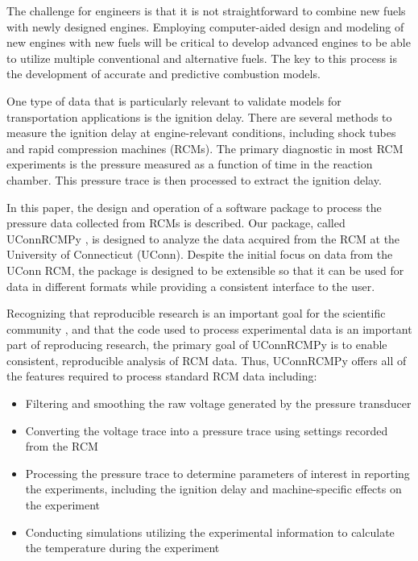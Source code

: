 \documentclass[12pt]{../ussci}
\begin{document}
The challenge for engineers is that it is not straightforward to combine
new fuels with newly designed engines. Employing computer-aided design
and modeling of new engines with new fuels will be critical to develop
advanced engines to be able to utilize multiple conventional and
alternative fuels. The key to this process is the development of
accurate and predictive combustion models.

One type of data that is particularly relevant to validate models for transportation
applications is the ignition delay. There are several methods to measure the ignition
delay at engine-relevant conditions, including shock tubes and rapid
compression machines (RCMs). The
primary diagnostic in most RCM experiments is the pressure measured as a
function of time in the reaction chamber. This pressure trace is then
processed to extract the ignition delay.

In this paper, the design and operation of a software package to process
the pressure data collected from RCMs is described. Our package, called
UConnRCMPy \autocite{uconnrcmpy}, is designed to analyze the data
acquired from the RCM at the University of Connecticut (UConn). Despite
the initial focus on data from the UConn RCM, the package is designed to
be extensible so that it can be used for data in different formats while
providing a consistent interface to the user.

Recognizing that reproducible research is an important goal for the
scientific community \autocite{NatureEds2016}, and that the code used to
process experimental data is an important part of reproducing research,
the primary goal of UConnRCMPy is to enable consistent, reproducible
analysis of RCM data. Thus, UConnRCMPy offers all of the features
required to process standard RCM data including:

\begin{itemize}
\item
  Filtering and smoothing the raw voltage generated by the pressure
  transducer
\item
  Converting the voltage trace into a pressure trace using settings
  recorded from the RCM
\item
  Processing the pressure trace to determine parameters of interest in
  reporting the experiments, including the ignition delay and
  machine-specific effects on the experiment
\item
  Conducting simulations utilizing the experimental information to
  calculate the temperature during the experiment
\end{itemize}
\end{document}
